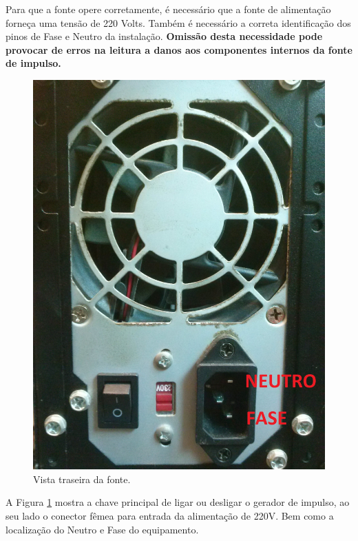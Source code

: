\documentclass[a4paper, 10pt]{article}
\begin{document}

Para que a fonte opere corretamente, é necessário que a fonte de alimentação 
forneça uma tensão de 220 Volts. Também é necessário a correta 
identificação dos pinos de Fase e Neutro da instalação. \textbf{Omissão desta necessidade 
pode provocar de erros na leitura a danos aos componentes internos da fonte de impulso.}

\begin{figure}[!h]
        \caption{\label{fig_vista_traseira_fonte} Vista traseira da fonte.}
	    \begin{center}
            \includegraphics[scale=0.08]{../fotos/fonte_alimentacao.jpg}
	    \end{center}
\end{figure}
A Figura \ref{fig_vista_traseira_fonte} mostra a chave principal de ligar ou 
desligar o gerador de impulso, ao seu lado o conector fêmea para entrada da alimentação de 220V.
Bem como a localização do Neutro e Fase do equipamento. 
\end{document}
